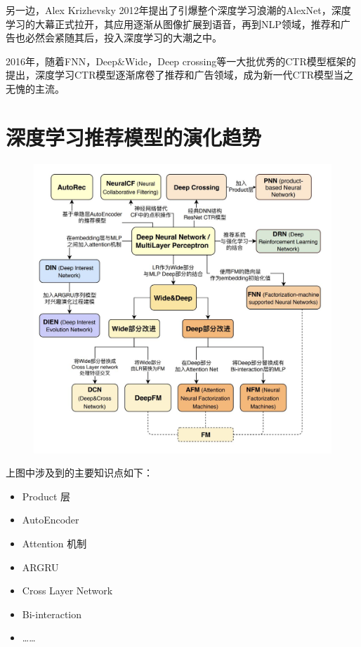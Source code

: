 \documentclass[12pt]{article}
\begin{document}
另一边，Alex Krizhevsky 2012年提出了引爆整个深度学习浪潮的AlexNet，深度学习的大幕正式拉开，其应用逐渐从图像扩展到语音，再到NLP领域，推荐和广告也必然会紧随其后，投入深度学习的大潮之中。

2016年，随着FNN，Deep\&Wide，Deep crossing等一大批优秀的CTR模型框架的提出，深度学习CTR模型逐渐席卷了推荐和广告领域，成为新一代CTR模型当之无愧的主流。

\section{深度学习推荐模型的演化趋势}
\begin{figure}[H]
    \centering
    \includegraphics[width=1\textwidth]{fig/Deep_Learning_Reference_System_Evolution.jpg}
\end{figure}

上图中涉及到的主要知识点如下：
\begin{itemize}
\setlength{\itemsep}{0pt}
\setlength{\parsep}{0pt}
\setlength{\parskip}{0pt}
    \item Product 层
    \item AutoEncoder
    \item Attention 机制
    \item ARGRU
    \item Cross Layer Network
    \item Bi-interaction
    \item ……
\end{itemize}
\end{document}
